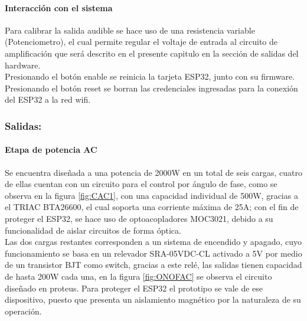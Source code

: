 	\paragraph{Interacción con el sistema}
		Para calibrar la salida audible se hace uso de una resistencia variable (Potenciometro), el cual permite regular el voltaje de entrada al circuito de amplificación que será descrito en el presente capitulo en la sección de salidas del hardware.\\
		
		Presionando el botón enable se reinicia la tarjeta ESP32, junto con su firmware.\\
		
		Presionando el botón reset se borran las credenciales ingresadas para la conexión del ESP32 a la red wifi.\\
	
		
	\subsubsection{Salidas:}
	\paragraph{Etapa de potencia AC}
		Se encuentra diseñada a una potencia de 2000W en un total de seis cargas, cuatro de ellas cuentan con un circuito para el control por ángulo de fase, como se observa en la figura \ref{fig:CAC1}, con una capacidad individual de 500W, gracias a el TRIAC BTA26600, el cual soporta una corriente máxima de 25A; con el fin de proteger el ESP32, se hace uso de optoacopladores MOC3021, debido a su funcionalidad de aislar circuitos de forma óptica.\\
		
%	
%	
		Las dos cargas restantes corresponden a un sistema de encendido y apagado, cuyo funcionamiento se basa en un relevador SRA-05VDC-CL activado a 5V por medio de un transistor BJT como switch, gracias a este relé, las salidas tienen capacidad de hasta 200W cada una, en la figura \ref{fig:ONOFAC} se observa el circuito diseñado en proteus. Para proteger el ESP32 el prototipo se vale de ese dispositivo, puesto que presenta un aislamiento magnético por la naturaleza de su operación.\\
	
